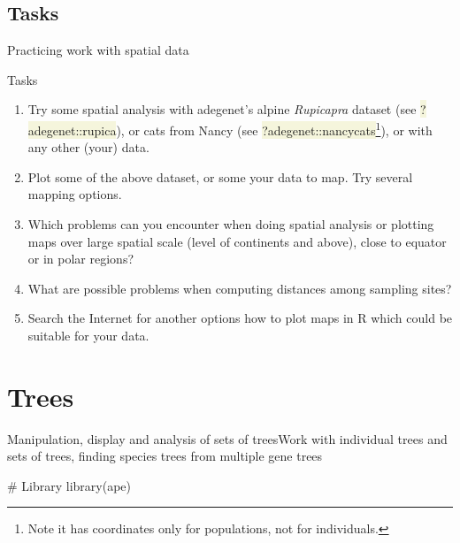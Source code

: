 \documentclass[compress, xelatex, 11pt, xcolor=svgnames, aspectratio=169,
	hyperref={
		bookmarks=true,
		unicode=true,
		colorlinks=true,
		pdftitle={Molecular data in R},
		plainpages=false,
		pdfauthor={Vojtech Zeisek},
		pdfsubject={Course about phylogeny and evolution in R},
		pdfcreator={XeLaTeX},
		pdfkeywords={R, evolution, phylogeny, molecular data},
		linkcolor=Crimson, %
		anchorcolor=Magenta, %
		citecolor=Magenta, %
		filecolor=Magenta, %
		menucolor=Magenta, %
		urlcolor=DodgerBlue, %
		},
	url={hyphens, lowtilde} %
	]{beamer}
\renewcommand{\texttt}[1]{\colorbox{Beige}{{\ttfamily #1}}}
\begin{document}
\subsection{Tasks}

\begin{frame}{Practicing work with spatial data}
	\begin{exampleblock}{Tasks}
		\begin{enumerate}
			\item Try some spatial analysis with adegenet's alpine \textit{Rupicapra} dataset (see \texttt{?adegenet::rupica}), or cats from Nancy (see \texttt{?adegenet::nancycats}\footnote{Note it has coordinates only for populations, not for individuals.}), or with any other (your) data.
			\item Plot some of the above dataset, or some your data to map. Try several mapping options.
			\item Which problems can you encounter when doing spatial analysis or plotting maps over large spatial scale (level of continents and above), close to equator or in polar regions?
			\item What are possible problems when computing distances among sampling sites?
			\item Search the Internet for another options how to plot maps in R which could be suitable for your data.
		\end{enumerate}
	\end{exampleblock}
\end{frame}

\section{Trees}

\begin{frame}[fragile]{Manipulation, display and analysis of sets of trees}{Work with individual trees and sets of trees, finding species trees from multiple gene trees}
	\tableofcontents[currentsection, sectionstyle=show/hide, hideothersubsections]
	\begin{spluscode}
    # Library
    library(ape)
	\end{spluscode}
\end{frame}
\end{document}
